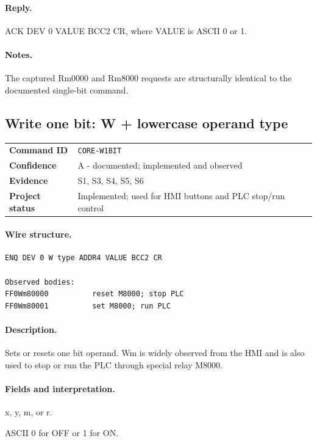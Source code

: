 \documentclass[10pt,letterpaper]{article}
\begin{document}
\paragraph{Reply.} ACK DEV 0 VALUE BCC2 CR, where VALUE is ASCII 0 or 1.
\paragraph{Notes.} The captured Rm0000 and Rm8000 requests are structurally identical to the documented single-bit command.

\subsection{Write one bit: W + lowercase operand type}
\begin{tabularx}{\textwidth}{@{}>{\bfseries}p{2.8cm}X@{}}
Command ID & \texttt{CORE-W1BIT} \\
Confidence & A - documented; implemented and observed \\
Evidence & S1, S3, S4, S5, S6 \\
Project status & Implemented; used for HMI buttons and PLC stop/run control \\
\end{tabularx}
\vspace{0.35em}
\paragraph{Wire structure.}
\begin{Verbatim}[breaklines=true,breakanywhere=true,fontsize=\small]
ENQ DEV 0 W type ADDR4 VALUE BCC2 CR

Observed bodies:
FF0Wm80000          reset M8000; stop PLC
FF0Wm80001          set M8000; run PLC
\end{Verbatim}
\paragraph{Description.} Sets or resets one bit operand. Wm is widely observed from the HMI and is also used to stop or run the PLC through special relay M8000.
\paragraph{Fields and interpretation.}
\begin{description}[style=nextline,leftmargin=3.2cm,labelwidth=3.0cm,font=\normalfont\bfseries]
\item[type] x, y, m, or r.
\item[VALUE] ASCII 0 for OFF or 1 for ON.
\end{description}
\end{document}
